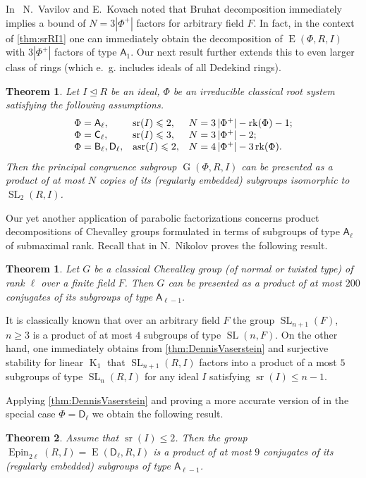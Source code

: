 \documentclass[12pt]{amsart}
\theoremstyle{plain}
\newtheorem{thm}{Theorem}
\numberwithin{equation}{section}
\numberwithin{lemma}{section}
\newtheorem*{thm*}{Theorem}
\theoremstyle{definition}
\theoremstyle{remark}
\DeclareMathOperator{\K}{K}
\DeclareMathOperator{\G}{G}
\DeclareMathOperator{\SL}{SL}
\DeclareMathOperator{\E}{E}
\DeclareMathOperator{\sr}{sr}
\DeclareMathOperator{\asr}{asr}
\DeclareMathOperator{\Epin}{Epin}
\DeclareMathOperator{\rk}{rk}
\newcommand{\rA}{\mathsf{A}}
\newcommand{\rB}{\mathsf{B}}
\newcommand{\rC}{\mathsf{C}}
\newcommand{\rD}{\mathsf{D}}
\begin{document}
In~\cite{VavKovSL2} N.~Vavilov and E.~Kovach noted that Bruhat decomposition immediately implies a bound of $N=3|\Phi^+|$ factors for arbitrary field $F$.
In fact, in the context of \cref{thm:srRI1} one can immediately obtain the decomposition of $\E(\Phi, R, I)$ with $3|\Phi^+|$ factors of type $\rA_1$.
Our next result further extends this to even larger class of rings (which e.\, g. includes ideals of all Dedekind rings).
\begin{thm}\label{thm:SL2width}
Let $I\trianglelefteq R$ be an ideal, $\Phi$ be an irreducible classical root system satisfying the following assumptions.
\[\begin{array}{l@{\quad}l@{\quad}l}
\Phi=\rA_\ell, & \sr(I)\leqslant 2, & N=3\left|\Phi^+\right| - \rk(\Phi) - 1; \\
\Phi=\rC_\ell, & \sr(I)\leqslant 3, & N=3\left|\Phi^+\right| - 2; \\
\Phi=\rB_\ell, \rD_\ell, & \asr(I)\leqslant 2, & N=4\left|\Phi^+\right| - 3\rk(\Phi).
\end{array}\]
Then the principal congruence subgroup $\G(\Phi, R, I)$ can be presented as a product of at most $N$ copies of its (regularly embedded) subgroups isomorphic to $\SL_2(R, I)$.
\end{thm}

Our yet another application of parabolic factorizations concerns product decompositions of Chevalley groups formulated in terms of subgroups of type $\rA_\ell$ of submaximal rank.
Recall that in \cite{NikProdDecomp} N.~Nikolov proves the following result. 
\begin{thm*} Let $G$ be a classical Chevalley group (of normal or twisted type) of rank $\ell$ over a finite field $F$.
Then $G$ can be presented as a product of at most $200$ conjugates of its subgroups of type $\rA_{\ell-1}$. \end{thm*}

It is classically known that over an arbitrary field $F$ the group $\SL_{n+1}(F)$, $n\geq 3$ is a product of at most $4$ subgroups of type $\SL(n, F)$.
On the other hand, one immediately obtains from \cref{thm:DennisVaserstein} and surjective stability for linear $\K_1$ that $\SL_{n+1}(R, I)$ factors into a product
of a most $5$ subgroups of type $\SL_n(R, I)$ for any ideal $I$ satisfying $\sr(I)\leqslant n-1$.

Applying \cref{thm:DennisVaserstein} and proving a more accurate version of \cite[Proposition~1]{NikProdDecomp} in the special case $\Phi=\rD_\ell$ we obtain the following result.
\begin{thm}\label{thm:spin-sln-prod}
Assume that $\sr(I) \leqslant 2$. Then the group $\Epin_{2\ell}(R, I)=\E(\rD_\ell, R, I)$ is a product of at most $9$ conjugates of its (regularly embedded) subgroups of type $\rA_{\ell-1}$.
\end{thm}
\end{document}
